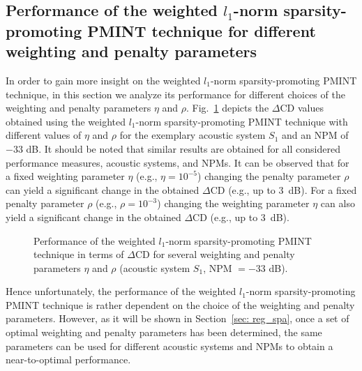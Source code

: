 \documentclass[10pt]{IEEEtran}
\begin{document}
\subsection{Performance of the weighted $l_1$-norm sparsity-promoting PMINT technique for different weighting and penalty parameters}
\label{sec: eta_rho}

In order to gain more insight on the weighted $l_1$-norm sparsity-promoting PMINT technique, in this section we analyze its performance for different choices of the weighting and penalty parameters $\eta$ and $\rho$.
Fig.~\ref{fig: eta_rho} depicts the $\Delta$CD values obtained using the weighted $l_1$-norm sparsity-promoting PMINT technique with different values of $\eta$ and $\rho$ for the exemplary acoustic system $S_1$ and an NPM of $-33$ dB.
It should be noted that similar results are obtained for all considered performance measures, acoustic systems, and NPMs.
It can be observed that for a fixed weighting parameter $\eta$ (e.g., $\eta = 10^{-5}$) changing the penalty parameter $\rho$ can yield a significant change in the obtained $\Delta$CD (e.g., up to $3$~dB).
For a fixed penalty parameter $\rho$ (e.g., $\rho = 10^{-3}$) changing the weighting parameter $\eta$ can also yield a significant change in the obtained $\Delta$CD (e.g., up to $3$~dB).
\begin{figure}[b!]
  \centering
  
\caption{Performance of the weighted $l_1$-norm sparsity-promoting PMINT technique in terms of $\Delta$CD for several weighting and penalty parameters $\eta$ and $\rho$ (acoustic system $S_1$, NPM $= -33$ dB).}
\label{fig: eta_rho}
\end{figure}
Hence unfortunately, the performance of the weighted $l_1$-norm sparsity-promoting PMINT technique is rather dependent on the choice of the weighting and penalty parameters. 
However, as it will be shown in Section~\ref{sec: reg_spa}, once a set of optimal weighting and penalty parameters has been determined, the same parameters can be used for different acoustic systems and NPMs to obtain a near-to-optimal performance.
\end{document}
